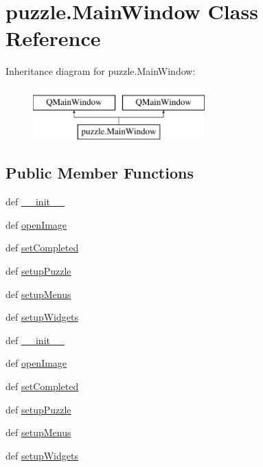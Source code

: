 \hypertarget{classpuzzle_1_1MainWindow}{}\section{puzzle.\+Main\+Window Class Reference}
\label{classpuzzle_1_1MainWindow}
Inheritance diagram for puzzle.\+Main\+Window\+:\begin{figure}[H]
\begin{center}
\leavevmode
\includegraphics[height=2.000000cm]{classpuzzle_1_1MainWindow}
\end{center}
\end{figure}
\subsection*{Public Member Functions}
\begin{DoxyCompactItemize}
\item 
def \hyperlink{classpuzzle_1_1MainWindow_ae59a5e90a063e63227bed92915283bfd}{\+\_\+\+\_\+init\+\_\+\+\_\+}
\item 
def \hyperlink{classpuzzle_1_1MainWindow_a9d5165d3c7ec9500416359dfa8b17bd2}{open\+Image}
\item 
def \hyperlink{classpuzzle_1_1MainWindow_a7c841f9b2a4768bcd9e66a28cabe7bf7}{set\+Completed}
\item 
def \hyperlink{classpuzzle_1_1MainWindow_a21f1b820d9039181872ddef2bd2fc7aa}{setup\+Puzzle}
\item 
def \hyperlink{classpuzzle_1_1MainWindow_ae9c29936bb8c7d3f9853d1ace31cb289}{setup\+Menus}
\item 
def \hyperlink{classpuzzle_1_1MainWindow_ae82fa845ce78edbcc75abafd14fe1b8a}{setup\+Widgets}
\item 
def \hyperlink{classpuzzle_1_1MainWindow_ae59a5e90a063e63227bed92915283bfd}{\+\_\+\+\_\+init\+\_\+\+\_\+}
\item 
def \hyperlink{classpuzzle_1_1MainWindow_a9d5165d3c7ec9500416359dfa8b17bd2}{open\+Image}
\item 
def \hyperlink{classpuzzle_1_1MainWindow_a7c841f9b2a4768bcd9e66a28cabe7bf7}{set\+Completed}
\item 
def \hyperlink{classpuzzle_1_1MainWindow_a21f1b820d9039181872ddef2bd2fc7aa}{setup\+Puzzle}
\item 
def \hyperlink{classpuzzle_1_1MainWindow_ae9c29936bb8c7d3f9853d1ace31cb289}{setup\+Menus}
\item 
def \hyperlink{classpuzzle_1_1MainWindow_ae82fa845ce78edbcc75abafd14fe1b8a}{setup\+Widgets}
\end{DoxyCompactItemize}
